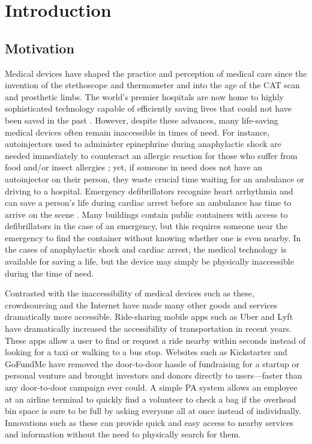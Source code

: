 \section{Introduction}

\onehalfspacing

\subsection{Motivation}

Medical devices have shaped the practice and perception of medical care since the invention of the stethoscope and thermometer and into the age of the CAT scan and prosthetic limbs. The world's premier hospitals are now home to highly sophisticated technology capable of efficiently saving lives that could not have been saved in the past \cite{advhosp}. However, despite these advances, many life-saving medical devices often remain inaccessible in times of need. For instance, autoinjectors used to administer epinephrine during anaphylactic shock are needed immediately to counteract an allergic reaction for those who suffer from food and/or insect allergies \cite{epifast}; yet, if someone in need does not have an autoinjector on their person, they waste crucial time waiting for an ambulance or driving to a hospital. Emergency defibrillators recognize heart arrhythmia and can save a person's life during cardiac arrest before an ambulance has time to arrive on the scene \cite{Kerber1677}. Many buildings contain public containers with access to defibrillators in the case of an emergency, but this requires someone near the emergency to find the container without knowing whether one is even nearby. In the cases of anaphylactic shock and cardiac arrest, the medical technology is available for saving a life, but the device may simply be physically inaccessible during the time of need.

Contrasted with the inaccessibility of medical devices such as these, crowdsourcing and the Internet have made many other goods and services dramatically more accessible. Ride-sharing mobile apps such as Uber and Lyft have dramatically increased the accessibility of transportation in recent years. These apps allow a user to find or request a ride nearby within seconds instead of looking for a taxi or walking to a bus stop. Websites such as Kickstarter and GoFundMe have removed the door-to-door hassle of fundraising for a startup or personal venture and brought investors and donors directly to users---faster than any door-to-door campaign ever could. A simple PA system allows an employee at an airline terminal to quickly find a volunteer to check a bag if the overhead bin space is sure to be full by asking everyone all at once instead of individually. Innovations such as these can provide quick and easy access to nearby services and information without the need to physically search for them.


